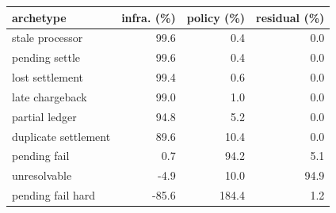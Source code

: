 \begin{tabular}{lrrr}
\toprule
archetype & infra. (\%) & policy (\%) & residual (\%) \\
\midrule
stale processor & 99.6 & 0.4 & 0.0 \\
pending settle & 99.6 & 0.4 & 0.0 \\
lost settlement & 99.4 & 0.6 & 0.0 \\
late chargeback & 99.0 & 1.0 & 0.0 \\
partial ledger & 94.8 & 5.2 & 0.0 \\
duplicate settlement & 89.6 & 10.4 & 0.0 \\
pending fail & 0.7 & 94.2 & 5.1 \\
unresolvable & -4.9 & 10.0 & 94.9 \\
pending fail hard & -85.6 & 184.4 & 1.2 \\
\bottomrule
\end{tabular}